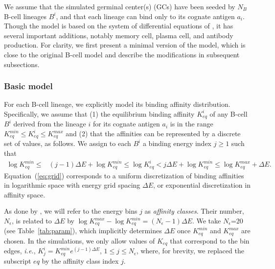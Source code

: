 \documentclass[utf8]{frontiersHLTH}%
\newcommand{\vo}[1]{#1} %
\def\ie {{\it i.e.}}
\newcommand{\Eq}[1] {Equation~(\ref{eq:#1})}
\newcommand{\fig}[1]{Fig.~\ref{fig:#1}}
\newcommand{\tab}[1]{Table~\ref{tab:#1}}
\newcommand{\hide}[1]{}
\begin{document}
We assume that the simulated germinal center(s) (GCs) have been seeded by
$N_B$ B-cell lineages $B^i$, and that each lineage can bind only to its cognate
antigen $a_i$. Though the model is based on the system of differential equations
of \citet{kepler93}, it has several important additions, \vo{notably}
memory cell, plasma cell, and antibody production. For clarity, we first present
a minimal version of the model, which is close to the original B-cell model\cite{kepler93} and describe the modifications in
subsequent subsections.
\hide{A visual schematic of the model components was given in \fig{model}.}
\subsubsection{Basic model}
\label{sec:basic}
For each B-cell lineage, we explicitly
model its binding affinity distribution. Specifically, we
assume that (1) the equilibrium binding affinity $K_{eq}^i$ of any B-cell $B^i$ derived from the lineage $i$
for its cognate antigen $a_i$ is in the range $K_{eq}^{min}\le K_{eq}^i \le K_{eq}^{max}$ and (2) that the affinities
can be represented by a discrete set of values, as follows. We assign to each $B^i$ a binding energy index $j\ge1$ such that
\begin{equation}
 \begin{aligned}
 \log K^{min}_{eq}\le& (j-1)\Delta E+\log K^{min}_{eq}\le \log K_{eq}^i
               < j\Delta E + \log K^{min}_{eq}\le\log K^{max}_{eq} +\Delta E.
 \end{aligned}
 \label{eq:grid}
\end{equation}
\Eq{grid} corresponds to a uniform discretization of binding
affinities in logarithmic space with energy grid spacing $\Delta E$, or exponential
discretization in affinity space.

As done by \citet{kepler93}, we will refer to the energy bins $j$ as
\textit{affinity classes}. Their number, $N_\epsilon$, is related to $\Delta E$ by $\log K^{max}_{eq} - \log K^{min}_{eq} =
(N_\epsilon-1)\Delta E$. We take
$N_\epsilon$=20 (see \tab{param}), which implicitly determines $\Delta E$
once $K^{min}_{eq}$ and $K^{max}_{eq}$ are chosen. In the simulations, we only
allow values of $K_{eq}$ that correspond to the bin edges, \ie,
$K^i_j=K^{min}_{eq}e^{(j-1)\Delta E}$, $1\le j\le N_\epsilon$, where,
for brevity, we replaced the subscript $eq$ by the affinity class index $j$.
\end{document}
